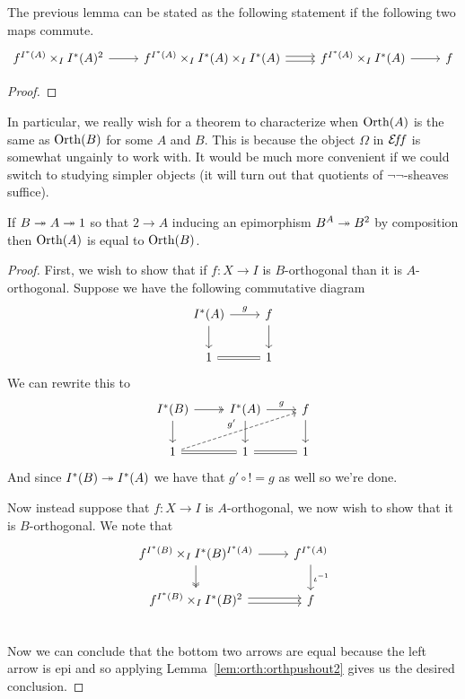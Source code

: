 \begin{cor}\label{lem:orth:orthpushout2}
  The previous lemma can be stated as the following statement if the
  following two maps commute.
  \[
    \begin{tikzcd}
      {f^{I^*(A)} \times_I I^*(A)^2} \ar[r] &
      {f^{I^*(A)} \times_I I^*(A) \times_I I^*(A)} \ar[r, shift left=0.2em] \ar[r, shift right=0.2em] &
      {f^{I^*(A)} \times_I I^*(A)} \ar[r] &
      f
    \end{tikzcd}
  \]
\end{cor}
\begin{proof}
\end{proof}
In particular, we really wish for a theorem to characterize when
$\operatorname{Orth}(A)$ is the same as $\operatorname{Orth}(B)$ for some $A$ and $B$. This is
because the object $\Omega$ in $\mathcal{E}\!f\!f$ is somewhat ungainly to work
with. It would be much more convenient if we could switch to studying
simpler objects (it will turn out that quotients of $\neg\neg$-sheaves
suffice).
\begin{lem}\label{lem:orth:orthequiv}
  If $B \twoheadrightarrow A \twoheadrightarrow 1$ so that $2 \to A$ inducing an epimorphism
  $B^A \twoheadrightarrow B^2$ by composition then $\operatorname{Orth}(A)$ is equal to
  $\operatorname{Orth}(B)$.
\end{lem}
\begin{proof}
  First, we wish to show that if $f : X \to I$ is $B$-orthogonal than
  it is $A$-orthogonal. Suppose we have the following commutative diagram
  \[
    \begin{tikzcd}
      I^*(A) \ar[r, "g"] \ar[d] & f \ar[d]\\
      1 \ar[r, equals] & 1
    \end{tikzcd}
  \]
  We can rewrite this to
  \[
    \begin{tikzcd}
      I^*(B) \ar[d] \ar[r, twoheadrightarrow] &I^*(A) \ar[r, "g"] \ar[d] & f \ar[d]\\
      1 \ar[r, equals] \ar[urr, dashed, "g'"] &1 \ar[r, equals] & 1
    \end{tikzcd}
  \]
  And since $I^*(B) \twoheadrightarrow I^*(A)$ we have that $g' \circ ! = g$ as well
  so we're done.

  Now instead suppose that $f : X \to I$ is $A$-orthogonal, we now
  wish to show that it is $B$-orthogonal. We note that
  \[
    \begin{tikzcd}
      {f^{I^*(B)} \times_I I^*(B)^{I^*(A)}} \ar[r] \ar[d, twoheadrightarrow] & f^{I^*(A)} \ar[d, "\iota^{-1}"]\\
      {f^{I^*(B)} \times_I I^*(B)^2} \ar[r, shift left=0.2em] \ar[r, shift right=0.2em] & f\\
    \end{tikzcd}
  \]
  Now we can conclude that the bottom two arrows are equal because the
  left arrow is epi and so applying
  Lemma~\ref{lem:orth:orthpushout2} gives us the desired conclusion.
\end{proof}
